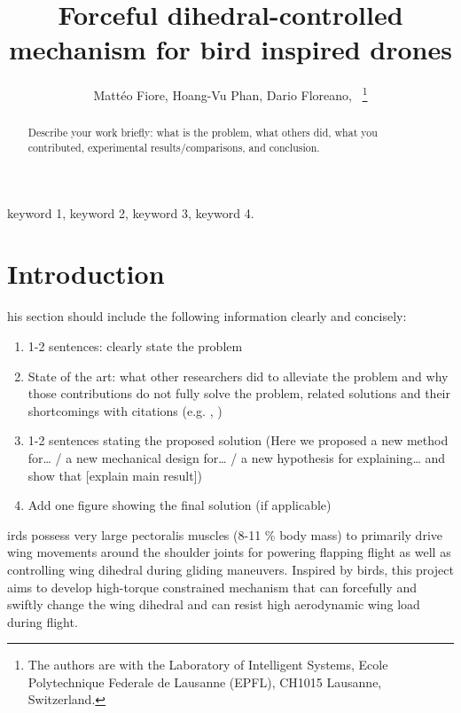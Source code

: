 \documentclass[lettersize,journal]{IEEEtran}
\begin{document}
\title{Forceful dihedral-controlled mechanism for bird inspired drones}

\author{Mattéo Fiore, Hoang-Vu Phan, Dario Floreano,~
\thanks{The authors are with
the Laboratory of Intelligent Systems, Ecole Polytechnique Federale de Lausanne (EPFL), CH1015 Lausanne, Switzerland.}}%


\maketitle

\begin{abstract}
Describe your work briefly: what is the problem, what others did, what you contributed, experimental results/comparisons, and conclusion.
\end{abstract}

\begin{IEEEkeywords}
keyword 1, keyword 2, keyword 3, keyword 4.
\end{IEEEkeywords}

\section{Introduction}
his section should include the following information clearly and concisely:
\begin{enumerate}
    \item 1-2 sentences: clearly state the problem
    \item State of the art: what other researchers did to alleviate the problem and why those contributions do not fully solve the problem, related solutions and their shortcomings with citations (e.g. \cite{Bircheretal}, \cite{Oettershagenetal})
    \item 1-2 sentences stating the proposed solution (Here we proposed a new method for… / a new mechanical design for… / a new hypothesis for explaining… and show that [explain main result])
    \item Add one figure showing the final solution (if applicable)
\end{enumerate}

irds possess very large pectoralis muscles (8-11 \% body mass) to primarily drive wing movements around the shoulder joints for
powering flapping flight as well as controlling wing dihedral during gliding maneuvers. Inspired by birds, this project aims to
develop high-torque constrained mechanism that can forcefully and swiftly change the wing dihedral and can resist high aerodynamic
wing load during flight.
\end{document}
